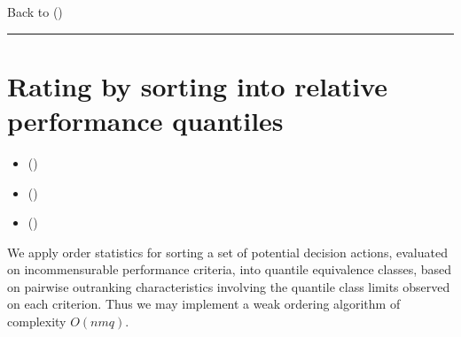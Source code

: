 \documentclass[a4paper,12pt,english]{sphinxhowto}
\begin{document}
Back to {\hyperref[\detokenize{tutorial:tutorial-label}]{}} ()


\bigskip\hrule\bigskip



\section{Rating by sorting into relative performance quantiles}
\label{\detokenize{tutorial:rating-by-sorting-into-relative-performance-quantiles}}\label{\detokenize{tutorial:quantilesrating-tutorial-label}}
\begin{sphinxShadowBox}
\begin{itemize}
\item {} 
\label{\detokenize{tutorial:id283}}{\hyperref[\detokenize{tutorial:quantile-sorting-on-a-single-criterion}]{}} ()

\item {} 
\label{\detokenize{tutorial:id284}}{\hyperref[\detokenize{tutorial:quantiles-sorting-with-multiple-performance-criteria}]{}} ()

\item {} 
\label{\detokenize{tutorial:id285}}{\hyperref[\detokenize{tutorial:ranking-big-performance-tableaux}]{}} ()

\end{itemize}
\end{sphinxShadowBox}

We apply order statistics for sorting a set  of  potential decision actions, evaluated on  incommensurable performance criteria, into  quantile equivalence classes, based on pairwise outranking characteristics involving the quantile class limits observed on each criterion. Thus we may implement a weak ordering algorithm of complexity \(O(nmq)\).
\end{document}
